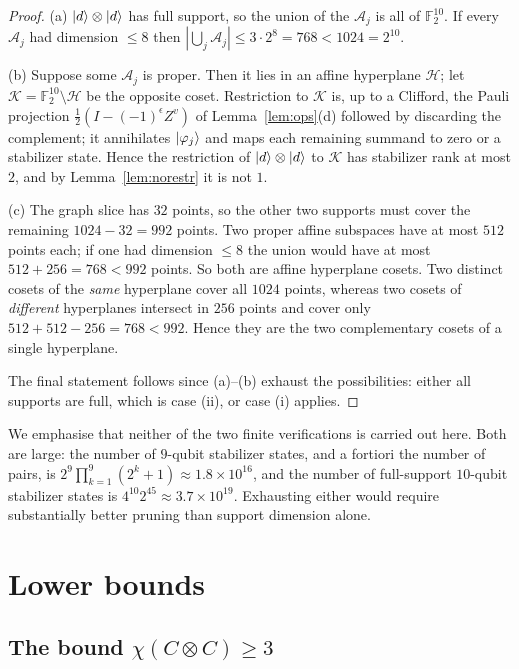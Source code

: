 \documentclass[11pt]{article}
\theoremstyle{plain}
\theoremstyle{definition}
\newcommand{\F}{\mathbb{F}}
\begin{document}
\begin{proof}
(a) $\ket d\otimes\ket d$ has full support, so the union of the $\mathcal A_j$ is all of
$\F_2^{10}$. If every $\mathcal A_j$ had dimension $\le8$ then
$|\bigcup_j\mathcal A_j|\le3\cdot2^8=768<1024=2^{10}$.

(b) Suppose some $\mathcal A_j$ is proper. Then it lies in an affine hyperplane
$\mathcal H$; let $\mathcal K=\F_2^{10}\setminus\mathcal H$ be the opposite coset.
Restriction to $\mathcal K$ is, up to a Clifford, the Pauli projection
$\frac12(I-(-1)^{\epsilon}Z^v)$ of Lemma~\ref{lem:ops}(d) followed by discarding the
complement; it annihilates $\ket{\varphi_j}$ and maps each remaining summand to zero or
a stabilizer state. Hence the restriction of $\ket d\otimes\ket d$ to $\mathcal K$ has
stabilizer rank at most $2$, and by Lemma~\ref{lem:norestr} it is not $1$.

(c) The graph slice has $32$ points, so the other two supports must cover the
remaining $1024-32=992$ points. Two proper affine subspaces have at most $512$ points
each; if one had dimension $\le8$ the union would have at most $512+256=768<992$
points. So both are affine hyperplane cosets. Two distinct cosets of the \emph{same}
hyperplane cover all $1024$ points, whereas two cosets of \emph{different} hyperplanes
intersect in $256$ points and cover only $512+512-256=768<992$. Hence they are the two
complementary cosets of a single hyperplane.

The final statement follows since (a)--(b) exhaust the possibilities: either all
supports are full, which is case (ii), or case (i) applies.
\end{proof}

We emphasise that neither of the two finite verifications is carried out here. Both are
large: the number of $9$-qubit stabilizer states, and a fortiori the number of pairs, is
$2^9\prod_{k=1}^{9}(2^k+1)\approx1.8\times10^{16}$, and the number of full-support
$10$-qubit stabilizer states is $4^{10}2^{45}\approx3.7\times10^{19}$. Exhausting either
would require substantially better pruning than support dimension alone.

\section{Lower bounds}\label{sec:lower}

\subsection{The bound $\chi(C\otimes C)\ge3$}
\end{document}
